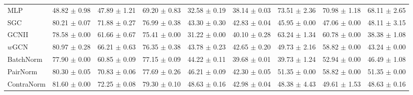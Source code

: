 \begin{table*}[t]
\begin{adjustbox}{width=0.95\textwidth}
\begin{tabular}{lllllllll}
\midrule
 MLP & 48.82 {\footnotesize $\pm$ 0.98} & 47.89 {\footnotesize $\pm$ 1.21} & 69.20 {\footnotesize $\pm$ 0.83} &32.58 {\footnotesize $\pm$ 0.19} & 38.14 {\footnotesize $\pm$ 0.03} & 73.51 {\footnotesize $\pm$ 2.36} & 70.98 {\footnotesize $\pm$ 1.18} & 68.11 {\footnotesize $\pm$ 2.65}\\
 SGC  &80.21 {\footnotesize $\pm$ 0.07 } & 71.88 {\footnotesize $\pm$ 0.27 }&76.99 {\footnotesize $\pm$ 0.38 }&43.30 {\footnotesize $\pm$ 0.30} & \cellcolor{secondbest}42.83 {\footnotesize $\pm$ 0.04} & 45.95 {\footnotesize $\pm$ 0.00} & 47.06 {\footnotesize $\pm$ 0.00} & 48.11 {\footnotesize $\pm$ 3.15}\\   
 GCNII & 78.58 {\footnotesize $\pm$ 0.00} & 61.66 {\footnotesize $\pm$ 0.67}  & 75.41 {\footnotesize $\pm$ 0.00} & 31.22 {\footnotesize $\pm$ 0.00} & 40.10 {\footnotesize $\pm$ 0.28} & 63.24 {\footnotesize $\pm$ 1.34} & 60.78 {\footnotesize $\pm$ 0.00} & 38.38 {\footnotesize $\pm$ 1.08 } \\
 $w$GCN & 80.97 {\footnotesize$\pm$ 0.28} &  66.21 {\footnotesize$\pm$ 0.63}  & 76.35 {\footnotesize$\pm$ 0.38 } & 43.78 {\footnotesize$\pm$ 0.23 } & 42.65 {\footnotesize$\pm$ 0.20 } & 49.73 {\footnotesize$\pm$ 2.16 } & 58.82 {\footnotesize$\pm$ 0.00 } & 43.24 {\footnotesize$\pm$ 0.00 } \\
\midrule
BatchNorm & 77.90 {\footnotesize $\pm$ 0.00 }&60.85 {\footnotesize $\pm$ 0.09 } &77.15 {\footnotesize $\pm$ 0.09 }&44.22 {\footnotesize $\pm$ 0.11} & 39.68 {\footnotesize $\pm$ 0.01} & 39.73 {\footnotesize $\pm$ 1.24} & 52.94 {\footnotesize $\pm$ 0.00} & 46.49 {\footnotesize $\pm$ 1.08}\\
PairNorm & 80.30 {\footnotesize $\pm$ 0.05 }&70.83 {\footnotesize $\pm$ 0.06 } &77.69 {\footnotesize $\pm$ 0.26 } &46.21 {\footnotesize $\pm$ 0.09} & 42.30 {\footnotesize $\pm$ 0.05} & 51.35 {\footnotesize $\pm$ 0.00} & 58.82 {\footnotesize $\pm$ 0.00} & 51.35 {\footnotesize $\pm$ 0.00}\\
 ContraNorm  &81.60 {\footnotesize $\pm$ 0.00 } &\cellcolor{secondbest}72.25 {\footnotesize $\pm$ 0.08 }  &\cellcolor{secondbest}79.30 {\footnotesize $\pm$ 0.10 } &\cellcolor{secondbest}48.63 {\footnotesize $\pm$ 0.16} & \cellcolor{best}42.98 {\footnotesize $\pm$ 0.04} & 48.38 {\footnotesize $\pm$ 4.43} & 49.61 {\footnotesize $\pm$ 1.53} & 48.63 {\footnotesize $\pm$ 0.16}\\

\end{tabular}
\end{adjustbox}
\end{table*}
